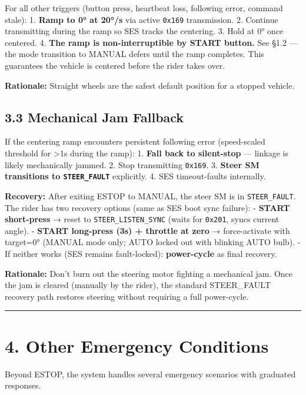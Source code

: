 \documentclass[12pt,a4paper,oneside]{report}
\begin{document}
For all other triggers (button press, heartbeat loss, following error, command
stale): 1. \textbf{Ramp to 0° at 20°/s} via active \texttt{0x169} transmission.
2. Continue transmitting during the ramp so SES tracks the centering. 3. Hold
at 0° once centered. 4. \textbf{The ramp is non-interruptible by START button.}
See §1.2 --- the mode transition to MANUAL defers until the ramp completes. This
guarantees the vehicle is centered before the rider takes over.

\textbf{Rationale:} Straight wheels are the safest default position for a
stopped vehicle.

\subsection{3.3 Mechanical Jam Fallback}\label{mechanical-jam-fallback}

If the centering ramp encounters persistent following error (speed-scaled
threshold for \textgreater1s during the ramp): 1. \textbf{Fall back to
silent-stop} --- linkage is likely mechanically jammed. 2. Stop transmitting
\texttt{0x169}. 3. \textbf{Steer SM transitions to \texttt{STEER\_FAULT}}
explicitly. 4. SES timeout-faults internally.

\textbf{Recovery:} After exiting ESTOP to MANUAL, the steer SM is in
\texttt{STEER\_FAULT}. The rider has two recovery options (same as SES boot
sync failure): - \textbf{START short-press} → reset to
\texttt{STEER\_LISTEN\_SYNC} (waits for \texttt{0x201}, syncs current angle). -
\textbf{START long-press (3s) + throttle at zero} → force-activate with
target=0° (MANUAL mode only; AUTO locked out with blinking AUTO bulb). - If
neither works (SES remains fault-locked): \textbf{power-cycle} as final
recovery.

\textbf{Rationale:} Don't burn out the steering motor fighting a mechanical jam.
Once the jam is cleared (manually by the rider), the standard STEER\_FAULT
recovery path restores steering without requiring a full power-cycle.

\begin{center}\rule{0.5\linewidth}{0.5pt}\end{center}

\section{4. Other Emergency Conditions}\label{other-emergency-conditions}

Beyond ESTOP, the system handles several emergency scenarios with graduated
responses.
\end{document}
